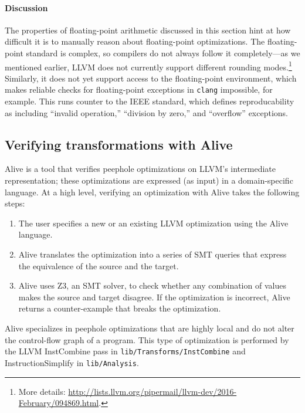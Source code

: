 \documentclass[preprint, numbers]{sigplanconf}
\begin{document}
\paragraph{Discussion} The properties of floating-point arithmetic discussed in
this section hint at how difficult it is to manually reason about
floating-point optimizations. The floating-point standard is complex, so
compilers do not always follow it completely---as we mentioned earlier, LLVM
does not currently support different rounding modes.\footnote{More details:
\url{http://lists.llvm.org/pipermail/llvm-dev/2016-February/094869.html}.}
Similarly, it does not yet support access to the floating-point environment,
which makes reliable checks for floating-point exceptions in \texttt{clang}
impossible, for example. This runs counter to the IEEE standard, which defines
reproducability as including ``invalid operation,'' ``division by zero,'' and
``overflow'' exceptions.


\subsection{Verifying transformations with Alive} \label{sec:alive}
Alive is a tool that verifies peephole optimizations on LLVM's intermediate
representation; these optimizations are expressed (as input) in a
domain-specific language. 
At a high level, verifying an optimization with Alive takes the following steps:

\begin{enumerate}

\item The user specifies a new or an existing LLVM optimization using the Alive
language.

\item Alive translates the optimization into a series of SMT queries that
express the equivalence of the source and the target.

\item Alive uses Z3, an SMT solver, to check whether any combination of values
makes the source and target disagree. If the optimization is incorrect, Alive
returns a counter-example that breaks the optimization.

\end{enumerate}

Alive specializes in peephole optimizations that are highly local and do not
alter the control-flow graph of a program. This type of optimization is
performed by the LLVM InstCombine pass in \texttt{lib/Transforms/InstCombine}
and InstructionSimplify in \texttt{lib/Analysis}.
\end{document}
